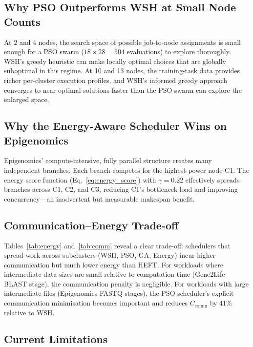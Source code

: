 \documentclass[10pt,twocolumn]{article}
\begin{document}
\subsection{Why PSO Outperforms WSH at Small Node Counts}

At 2 and 4 nodes, the search space of possible job-to-node assignments is small
enough for a PSO swarm ($18\!\times\!28 = 504$ evaluations) to explore thoroughly.
WSH's greedy heuristic can make locally optimal choices that are globally
suboptimal in this regime. At 10 and 13 nodes, the training-task data provides
richer per-cluster execution profiles, and WSH's informed greedy approach converges
to near-optimal solutions faster than the PSO swarm can explore the enlarged space.

\subsection{Why the Energy-Aware Scheduler Wins on Epigenomics}

Epigenomics' compute-intensive, fully parallel structure creates many independent
branches. Each branch competes for the highest-power node C1. The energy score
function (Eq.~\ref{eq:energy_score}) with $\gamma = 0.22$ effectively spreads
branches across C1, C2, and C3, reducing C1's bottleneck load and improving
concurrency---an inadvertent but measurable makespan benefit.

\subsection{Communication--Energy Trade-off}

Tables~\ref{tab:energy} and~\ref{tab:comm} reveal a clear trade-off: schedulers
that spread work across subclusters (WSH, PSO, GA, Energy) incur higher communication
but much lower energy than HEFT. For workloads where intermediate data sizes are
small relative to computation time (Gene2Life BLAST stage), the communication penalty
is negligible. For workloads with large intermediate files (Epigenomics FASTQ
stages), the PSO scheduler's explicit communication minimisation becomes important
and reduces $C_{\text{comm}}$ by 41\% relative to WSH.

\subsection{Current Limitations}
\end{document}

